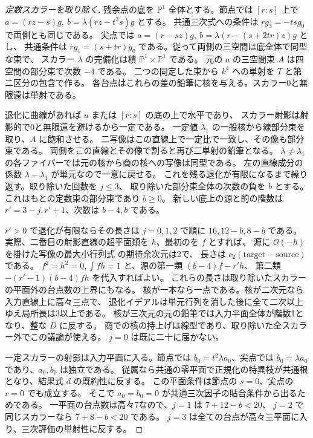 \begin{proof}[定数スカラーを取り除く]
残余点の底を $\mathbb P^1$ 全体とする。節点では $[r:s]$ 上で
$a=(rz-s)g,\ b=\lambda(rz-t^2s)g$ とする。
共通三次式への条件は $r g_3=-t s g_0$ で両側とも同じである。
尖点では $a=(r-sz)g,\ b=\lambda(r-(s+2tr)z)g$ とし、
共通条件は $r g_1=(s+tr)g_0$ である。従って両側の三空間は底全体で同型な束で、
スカラー $\lambda$ の完備化は積 $\mathbb P^1\times\mathbb P^1$ である。
元の $a$ の三空間束 $A$ は四空間の部分束で次数 $-4$ である。
二つの同定した束から $k^4$ への単射を $T$ と第二区分の包含で作る。
各台点はこれらの差の鉛筆に核を与える。スカラー0と無限遠は単射である。

退化に曲線があれば $u$ または $[r:s]$ の底の上で水平であり、
スカラー射影は射影的で0と無限遠を避けるから一定である。
一定値 $\lambda_1$ の一般核から線部分束を取り、$A$ に飽和させる。
二写像はこの直線上で一定比で一致し、その像も部分束である。
両側をこの直線とその像で割ると再び二単射の鉛筆となる。
$\lambda\ne\lambda_1$ の各ファイバーでは元の核から商の核への写像は同型である。
左の直線成分の係数 $\lambda-\lambda_1$ が単元なので一意に戻せる。
これを残る退化が有限になるまで繰り返す。取り除いた回数を $j\le3$、
取り除いた部分束全体の次数の負を $b$ とする。これはもとの定数束の部分束であり $b\ge0$。
新しい底上の源と的の階数は $r'=3-j,r'+1$、次数は $b-4,b$ である。

$r'>0$ で退化が有限ならその長さは $j=0,1,2$ で順に
$16,12-b,8-b$ である。実際、二番目の射影直線の超平面類を $h$、最初のを $f$ とすれば、
源に $\mathcal O(-h)$ を掛けた写像の最大小行列式 の期待余次元は2で、
長さは $c_2(\mathrm{target}-\mathrm{source})$ である。
$f^2=h^2=0,\int fh=1$ と、源の第一類 $(b-4)f-r'h$、
第二類 $-(r'-1)(b-4)fh$ を代入すればよい。
これらの長さは取り除いたスカラーの平面外の台点数の上界にもなる。
核が一本なら一点である。核が二次元なら入力直線上に高々三点で、
退化イデアルは単元行列を消した後に全て二次以上ゆえ局所長は3以上である。
核が三次元の元の鉛筆では入力平面全体が階数1となり、整な $D$ に反する。
商での核の持上げは線型であり、取り除いた全スカラー外でこの議論が使える。
$j=0$ は既に二十に届かない。

一定スカラーの射影は入力平面に入る。節点では $b_0=t^2\lambda a_0$、尖点では
$b_0=\lambda a_0$ であり、$a_0,b_0$ は独立である。
従属なら共通の零平面で正規化の特異枝が共通根となり、結果式 $d$ の既約性に反する。
この平面条件は節点の $s=0$、尖点の $r=0$ でも成立する。
そこで $a_0=b_0=0$ が共通三次因子の貼合条件から出るためである。
一平面の台点数は高々7なので、$j=1$ は $7+12-b<20$、
$j=2$ で同じスカラーなら $7+8-b<20$ である。
$j=3$ は全ての台点が高々三平面に入り、三次評価の単射性に反する。
\end{proof}

